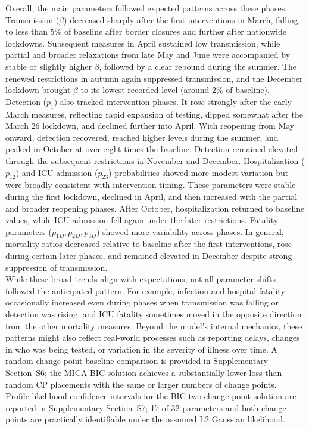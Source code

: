 \documentclass[10pt,letterpaper]{article}
\begin{document}
Overall, the main parameters followed expected patterns across these phases. Transmission ($\beta$) decreased sharply after the first interventions in March, falling to less than 5\% of baseline after border closures and further after nationwide lockdowns. Subsequent measures in April sustained low transmission, while partial and broader relaxations from late May and June were accompanied by stable or slightly higher $\beta$, followed by a clear rebound during the summer. The renewed restrictions in autumn again suppressed transmission, and the December lockdown brought $\beta$ to its lowest recorded level (around 2\% of baseline). Detection ($p_{1}$) also tracked intervention phases. It rose strongly after the early March measures, reflecting rapid expansion of testing, dipped somewhat after the March 26 lockdown, and declined further into April. With reopening from May onward, detection recovered, reached higher levels during the summer, and peaked in October at over eight times the baseline. Detection remained elevated through the subsequent restrictions in November and December. Hospitalization ($p_{12}$) and ICU admission ($p_{23}$) probabilities showed more modest variation but were broadly consistent with intervention timing. These parameters were stable during the first lockdown, declined in April, and then increased with the partial and broader reopening phases. After October, hospitalization returned to baseline values, while ICU admission fell again under the later restrictions. Fatality parameters ($p_{1D}, p_{2D}, p_{3D}$) showed more variability across phases. In general, mortality ratios decreased relative to baseline after the first interventions, rose during certain later phases, and remained elevated in December despite strong suppression of transmission.\\
While these broad trends align with expectations, not all parameter shifts followed the anticipated pattern. For example, infection and hospital fatality occasionally increased even during phases when transmission was falling or detection was rising, and ICU fatality sometimes moved in the opposite direction from the other mortality measures. Beyond the model's internal mechanics, these patterns might also reflect real-world processes such as reporting delays, changes in who was being tested, or variation in the severity of illness over time. A random change-point baseline comparison is provided in Supplementary Section~S6; the MICA BIC solution achieves a substantially lower loss than random CP placements with the same or larger numbers of change points. Profile-likelihood confidence intervals for the BIC two-change-point solution are reported in Supplementary Section~S7; 17 of 32 parameters and both change points are practically identifiable under the assumed L2 Gaussian likelihood.
\end{document}
